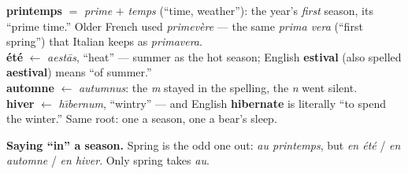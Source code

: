 \begin{cousinweb}
\textbf{printemps} $=$ \emph{prime} $+$ \emph{temps} (``time, weather''): the
year's \emph{first} season, its ``prime time.'' Older French used
\emph{primev\`{e}re} --- the same \emph{prima vera} (``first spring'') that
Italian keeps as \emph{primavera}.\\[3pt]
\textbf{\'{e}t\'{e}} $\leftarrow$ \emph{aest\=as}, ``heat'' --- summer as the
hot season; English \textbf{estival} (also spelled \textbf{aestival}) means ``of
summer.''\\[3pt]
\textbf{automne} $\leftarrow$ \emph{autumnus}: the \emph{m} stayed in the
spelling, the \emph{n} went silent.\\[3pt]
\textbf{hiver} $\leftarrow$ \emph{h\={\i}bernum}, ``wintry'' --- and English
\textbf{hibernate} is literally ``to spend the winter.'' Same root: one a
season, one a bear's sleep.
\end{cousinweb}

\begin{grammarlens}
\textbf{Saying ``in'' a season.} Spring is the odd one out: \emph{au printemps},
but \emph{en \'{e}t\'{e}} / \emph{en automne} / \emph{en hiver}. Only spring
takes \emph{au}.
\end{grammarlens}

